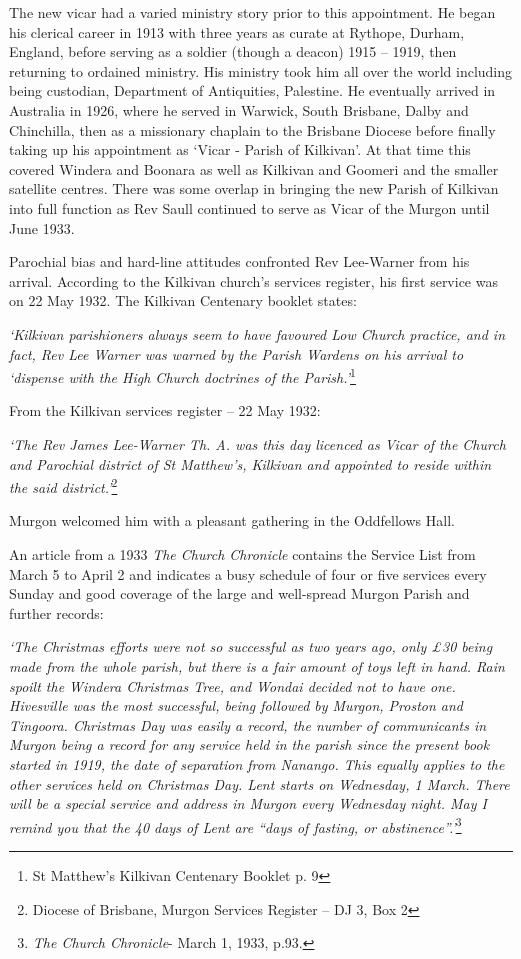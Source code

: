The new vicar had a varied ministry story prior to this appointment. He began his clerical career in 1913 with three years as curate at Rythope, Durham, England, before serving as a soldier (though a deacon) 1915 -- 1919, then returning to ordained ministry. His ministry took him all over the world including being custodian, Department of Antiquities, Palestine. He eventually arrived in Australia in 1926, where he served in Warwick, South Brisbane, Dalby and Chinchilla, then as a missionary chaplain to the Brisbane Diocese before finally taking up his appointment as `Vicar - Parish of Kilkivan'. At that time this covered Windera and Boonara as well as Kilkivan and Goomeri and the smaller satellite centres. There was some overlap in bringing the new Parish of Kilkivan into full function as Rev Saull continued to serve as Vicar of the Murgon until June 1933.



Parochial bias and hard-line attitudes confronted Rev Lee-Warner from his arrival. According to the Kilkivan church's services register, his first service was on 22 May 1932. The Kilkivan Centenary booklet states:



\emph{`Kilkivan parishioners always seem to have favoured Low Church practice, and in fact, Rev Lee Warner was warned by the Parish Wardens on his arrival to `dispense with the High Church doctrines of the Parish.'}\footnote{St Matthew's Kilkivan Centenary Booklet p. 9}


From the Kilkivan services register -- 22 May 1932:



\emph{`The Rev James Lee-Warner Th. A. was this day licenced as Vicar of the Church and Parochial district of St Matthew's, Kilkivan and appointed to reside within the said district.'}\footnote{Diocese of Brisbane, Murgon Services Register -- DJ 3, Box 2}


Murgon welcomed him with a pleasant gathering in the Oddfellows Hall.



An article from a 1933 \emph{The Church Chronicle} contains the Service List from March 5 to April 2 and indicates a busy schedule of four or five services every Sunday and good coverage of the large and well-spread Murgon Parish and further records:



\emph{`The Christmas efforts were not so successful as two years ago, only \pounds30 being made from the whole parish, but there is a fair amount of toys left in hand. Rain spoilt the Windera Christmas Tree, and Wondai decided not to have one. Hivesville was the most successful, being followed by Murgon, Proston and Tingoora. Christmas Day was easily a record, the number of communicants in Murgon being a record for any service held in the parish since the present book started in 1919, the date of separation from Nanango. This equally applies to the other services held on Christmas Day. Lent starts on Wednesday, 1 March. There will be a special service and address in Murgon every Wednesday night. May I remind you that the 40 days of Lent are ``days of fasting, or abstinence''.'}\footnote{\emph{The Church Chronicle}- March 1, 1933, p.93.}


